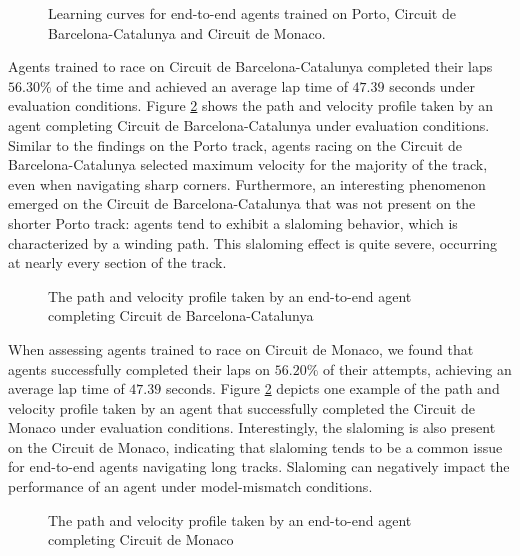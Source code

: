 \begin{figure}[htb!]
    \centering
    
    \caption[Learning curves for end-to-end agents trained and tested on Porto, Circuit de Barcelona-Catalunya and Circuit de Monaco]{Learning curves for end-to-end agents trained on Porto, Circuit de Barcelona-Catalunya and Circuit de Monaco.}
    \label{fig:ete_reward}
\end{figure}


Agents trained to race on Circuit de Barcelona-Catalunya completed their laps $56.30\%$ of the time and achieved an average lap time of $47.39$ seconds under evaluation conditions.
Figure \ref{fig:ete_esp} shows the path and velocity profile taken by an agent completing Circuit de Barcelona-Catalunya under evaluation conditions.
Similar to the findings on the Porto track, agents racing on the Circuit de Barcelona-Catalunya selected maximum velocity for the majority of the track, even when navigating sharp corners. 
Furthermore, an interesting phenomenon emerged on the Circuit de Barcelona-Catalunya that was not present on the shorter Porto track: agents tend to exhibit a slaloming behavior, which is characterized by a winding path. 
This slaloming effect is quite severe, occurring at nearly every section of the track.


\begin{figure}[htb!]
    \centering
    
    \caption[The path and velocity profile taken by an end-to-end agent completing Circuit de Barcelona-Catalunya]{The path and velocity profile taken by an end-to-end agent completing Circuit de Barcelona-Catalunya}
    \label{fig:ete_esp}
\end{figure}

When assessing agents trained to race on Circuit de Monaco, we found that agents successfully completed their laps on $56.20\%$ of their attempts, achieving an average lap time of $47.39$ seconds. 
Figure \ref{fig:ete_esp} depicts one example of the path and velocity profile taken by an agent that successfully completed the Circuit de Monaco under evaluation conditions. 
Interestingly, the slaloming is also present on the Circuit de Monaco, indicating that slaloming tends to be a common issue for end-to-end agents navigating long tracks.
Slaloming can negatively impact the performance of an agent under model-mismatch conditions.

\begin{figure}[htb!]
    \centering
    
    \caption[The path and velocity profile taken by an end-to-end agent completing Circuit de Monaco]{The path and velocity profile taken by an end-to-end agent completing Circuit de Monaco}
    \label{fig:ete_mco}
\end{figure}





